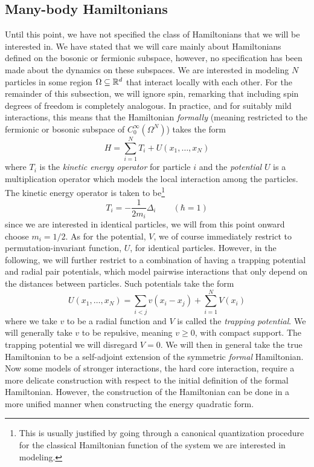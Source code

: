 \subsection{Many-body Hamiltonians}
Until this point, we have not specified the class of Hamiltonians that we will be interested in. We have stated that we will care mainly about Hamiltonians defined on the bosonic or fermionic subspace, however, no specification has been made about the dynamics on these subspaces. We are interested in modeling $ N $ particles in some region $ \Omega\subseteq\mathbb{R}^d $ that interact locally with each other. For the remainder of this subsection, we will ignore spin, remarking that including spin degrees of freedom is completely analogous. In practice, and for suitably mild interactions, this means that the Hamiltonian \emph{formally} (meaning restricted to the fermionic or bosonic subspace of $ C^\infty_0(\Omega^N) $) takes the form \begin{equation}
H=\sum_{i=1}^{N}T_i+U(x_1,\ldots,x_N)
\end{equation}
where $ T_i $ is the \emph{kinetic energy operator} for particle $ i $ and the \emph{potential} $ U $ is a multiplication operator which models the local interaction among the particles. The kinetic energy operator is taken to be\footnote{This is usually justified by going through a canonical quantization procedure for the classical Hamiltonian function of the system we are interested in modeling.} \begin{equation}
T_i=-\frac{1}{2m_i}\Delta_i\qquad (\hbar=1)
\end{equation} 
since we are interested in identical particles, we will from this point onward choose $ m_i=1/2 $. As for the potential, $ V $, we of course immediately restrict to permutation-invariant function, $ U $, for identical particles. However, in the following, we will further restrict to a combination of having a trapping potential and radial pair potentials, which model pairwise interactions that only depend on the distances between particles. Such potentials take the form \begin{equation}
U(x_1,\ldots,x_N)=\sum_{i<j} v(x_i-x_j) + \sum_{i=1}^{N}V(x_i)
\end{equation}
where we take $ v $ to be a radial function and $ V $ is called the \emph{trapping potential}. We will generally take $ v $ to be repulsive, meaning $ v\geq 0 $, with compact support. The trapping potential we will disregard \ie $ V=0 $. We will then in general take the true Hamiltonian to be a self-adjoint extension of the symmetric \emph{formal} Hamiltonian. Now some models of stronger interactions, \eg the hard core interaction, require a more delicate construction with respect to the initial definition of the formal Hamiltonian. However, the construction of the Hamiltonian can be done in a more unified manner when constructing the energy quadratic form. 
